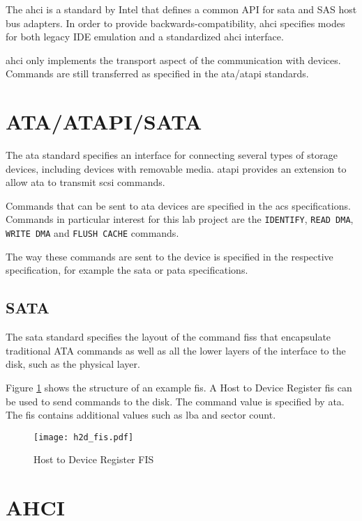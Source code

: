 The \ac{ahci} is a standard by Intel that defines a common API for \ac{sata}
and SAS host bus adapters. In order to provide backwards-compatibility,
\ac{ahci} specifies modes for both legacy IDE emulation and a standardized
\ac{ahci} interface. 

\ac{ahci} only implements the transport aspect of the communication with
devices. Commands are still transferred as specified in the \ac{ata}/\ac{atapi}
standards.

\section{ATA/ATAPI/SATA}

The \ac{ata} standard specifies an interface for connecting several types of
storage devices, including devices with removable media. \ac{atapi} provides an
extension to allow \ac{ata} to transmit \acs{scsi} commands.

Commands that can be sent to \ac{ata} devices are specified in the \ac{acs}
specifications. Commands in particular interest for this lab project are the
\texttt{IDENTIFY}, \texttt{READ DMA}, \texttt{WRITE DMA} and \texttt{FLUSH
CACHE} commands.

The way these commands are sent to the device is specified in the respective
specification, for example the \ac{sata} or \ac{pata} specifications.

\subsection{SATA}

The \ac{sata} standard specifies the layout of the command \acp{fis} that
encapsulate traditional ATA commands as well as all the lower layers of the
interface to the disk, such as the physical layer.

Figure \ref{fig:h2d_fis} shows the structure of an example \ac{fis}. A Host to
Device Register \ac{fis} can be used to send commands to the disk. The command
value is specified by \ac{ata}. The \ac{fis} contains additional values such as
\ac{lba} and sector count.

\begin{figure}[ht]
\centering
\texttt{[image: h2d\_fis.pdf]}
\caption{Host to Device Register FIS \cite[p.~336]{sata_2.6}}
\label{fig:h2d_fis}
\end{figure}

\section{AHCI}

